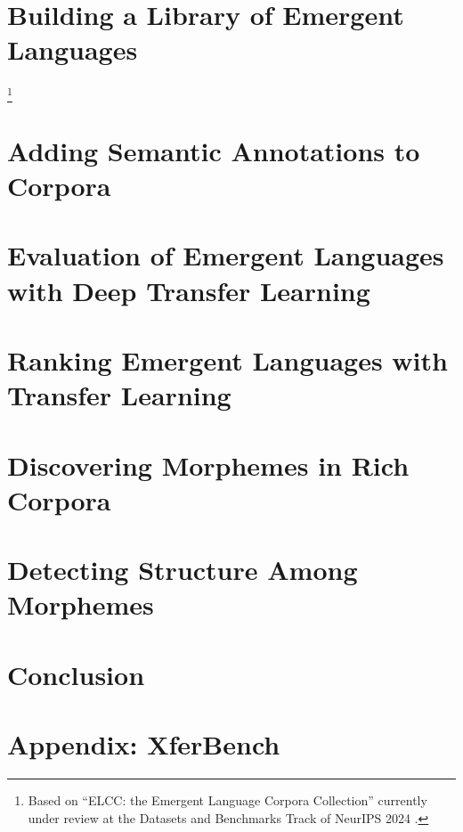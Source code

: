 \newpage
\tableofcontents*



\chapter{Building a Library of Emergent Languages }

\footnote{Based on ``ELCC: the Emergent Language Corpora Collection'' currently under review at the Datasets and Benchmarks Track of NeurIPS 2024 .}


\chapter{Adding Semantic Annotations to Corpora }
\unskip\label{ch:rich-corpora}




\chapter{Evaluation of Emergent Languages with Deep Transfer Learning}



\chapter{Ranking Emergent Languages with Transfer Learning }
\unskip\label{ch:xferbench-analysis}



\chapter{Discovering Morphemes in Rich Corpora }
\unskip\label{ch:morphemes}



\chapter{Detecting Structure Among Morphemes }
\unskip\label{ch:syntax}




\chapter{Conclusion}




\appendix

\chapter{Appendix: XferBench}



